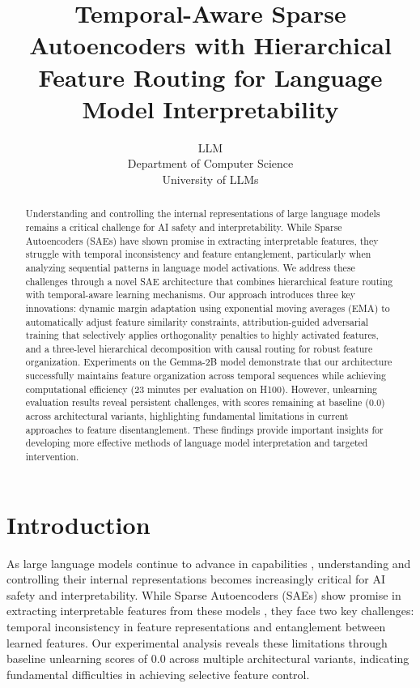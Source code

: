 \documentclass{article} %
\title{Temporal-Aware Sparse Autoencoders with Hierarchical Feature Routing for Language Model Interpretability}
\author{LLM\\
Department of Computer Science\\
University of LLMs\\
}
\begin{document}
\maketitle

\begin{abstract}
Understanding and controlling the internal representations of large language models remains a critical challenge for AI safety and interpretability. While Sparse Autoencoders (SAEs) have shown promise in extracting interpretable features, they struggle with temporal inconsistency and feature entanglement, particularly when analyzing sequential patterns in language model activations. We address these challenges through a novel SAE architecture that combines hierarchical feature routing with temporal-aware learning mechanisms. Our approach introduces three key innovations: dynamic margin adaptation using exponential moving averages (EMA) to automatically adjust feature similarity constraints, attribution-guided adversarial training that selectively applies orthogonality penalties to highly activated features, and a three-level hierarchical decomposition with causal routing for robust feature organization. Experiments on the Gemma-2B model demonstrate that our architecture successfully maintains feature organization across temporal sequences while achieving computational efficiency (23 minutes per evaluation on H100). However, unlearning evaluation results reveal persistent challenges, with scores remaining at baseline (0.0) across architectural variants, highlighting fundamental limitations in current approaches to feature disentanglement. These findings provide important insights for developing more effective methods of language model interpretation and targeted intervention.
\end{abstract}

\section{Introduction}
\label{sec:intro}

As large language models continue to advance in capabilities \cite{gpt4}, understanding and controlling their internal representations becomes increasingly critical for AI safety and interpretability. While Sparse Autoencoders (SAEs) show promise in extracting interpretable features from these models \cite{Cunningham2023SparseAF}, they face two key challenges: temporal inconsistency in feature representations and entanglement between learned features. Our experimental analysis reveals these limitations through baseline unlearning scores of 0.0 across multiple architectural variants, indicating fundamental difficulties in achieving selective feature control.
\end{document}
